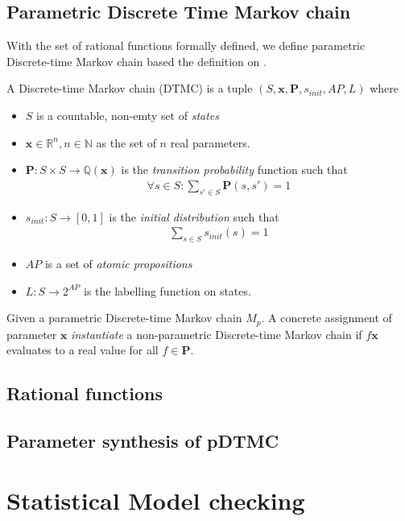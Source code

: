 \subsection{Parametric Discrete Time Markov chain}
With the set of rational functions formally defined, we define parametric Discrete-time Markov chain
based the definition on \cite{junges2019parameter}.
\begin{definition}
    A Discrete-time Markov chain (DTMC) is a tuple $(S, \mathbf{x}, \mathbf{P}, s_{init}, AP, L)$
    where
    \begin{itemize}
        \item $S$ is a countable, non-emty set of \textit{states}
        \item $\mathbf{x} \in \mathbb{R}^n, n \in \mathbb{N}$ as the set of $n$ real parameters.
        \item $\mathbf{P}:S\times S \rightarrow \mathbb{Q}(\mathbf{x})$ is the \textit{transition
                  probability} function such that
              \begin{align*}
                  \forall s \in S : \sum_{s'\in S}\mathbf{P}(s, s') = 1
              \end{align*}
        \item $s_{init}: S \rightarrow [0,1]$ is the \textit{initial distribution} such that
              \begin{align*}
                  \sum_{s\in S}s_{init}(s) = 1
              \end{align*}
        \item $AP$ is a set of \textit{atomic propositions}
        \item $L: S \rightarrow 2^{AP}$ is the labelling function on states.
    \end{itemize}
\end{definition}

Given a parametric Discrete-time Markov chain $M_p$. A concrete assignment of parameter $\mathbf{x}$
\textit{instantiate} a non-parametric Discrete-time Markov chain if $f{\mathbf{x}}$ evaluates to a
real value for all $f\in\mathbf{P}$.

\subsection{Rational functions}

\subsection{Parameter synthesis of pDTMC}

\section{Statistical Model checking}

